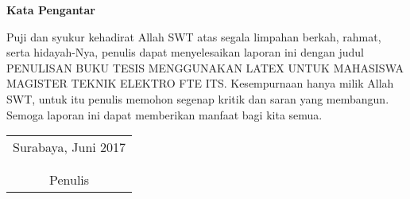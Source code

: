 \begin{center}
\Large\textbf{Kata Pengantar}
\end{center}
\vspace{2ex}
Puji dan syukur kehadirat Allah SWT atas segala limpahan berkah, rahmat, serta hidayah-Nya, penulis  dapat menyelesaikan laporan ini dengan judul PENULISAN BUKU TESIS MENGGUNAKAN LATEX UNTUK MAHASISWA MAGISTER TEKNIK ELEKTRO FTE ITS. \vspace{1ex}
Kesempurnaan hanya milik Allah SWT, untuk itu penulis memohon segenap kritik dan saran yang  membangun. Semoga laporan ini dapat memberikan manfaat bagi kita semua.
	\vspace{26pt}
	\begin{flushright}
		\begin{tabular}[b]{c}
			Surabaya, Juni 2017
			\\
			\\
			\\
			Penulis
		\end{tabular}
	\end{flushright}

